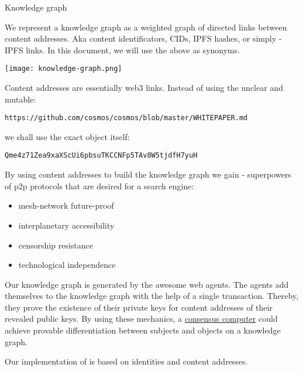 \documentclass[8pt,oneside]{amsart}
\makeatletter
\newcommand{\linkred}[2]{\href{#1}{\color{red}{#2}}}
\newcommand{\linkgreen}[2]{\href{#1}{\color{green}{#2}}}
\renewcommand\subsection{\@startsection{subsection}
                                    {2}{\z@}
                                    {-3.25ex\@plus -1ex \@minus -.2ex}
                                    {0ex \@plus .2ex}
                                    {\play\Large}
                        }
\newcommand{\titleSection}[1]{\subsection{#1}}
\newenvironment{Figure}
  {\par\medskip\noindent\minipage{\linewidth}}
  {\endminipage\par\medskip}
\makeatother
\begin{document}
\titleSection{Knowledge graph}\label{knowledge-graph}

We represent a knowledge graph as a weighted graph of directed links between content addresses. Aka content identificators, CIDs, IPFS hashes, or simply - IPFS links. In this document, we will use the above as synonyms.

\begin{Figure}
    \centering
    \texttt{[image: knowledge-graph.png]}
\end{Figure}

Content addresses are essentially web3 links. Instead of using the unclear and mutable:
\begin{lstlisting}
https://github.com/cosmos/cosmos/blob/master/WHITEPAPER.md
\end{lstlisting}
we shall use the exact object itself:
\begin{lstlisting}
Qme4z71Zea9xaXScUi6pbsuTKCCNFp5TAv8W5tjdfH7yuH
\end{lstlisting}

By using content addresses to build the knowledge graph we gain \linkred{https://steemit.com/web3/@hipster/an-idea-of-decentralized-search-for-web3-ce860d61defe5est}{the so much needed} \linkgreen{https://ipfs.io/ipfs/QmV9tSDx9UiPeWExXEeH6aoDvmihvx6jD5eLb4jbTaKGps}{IPFS} - \linkgreen{https://ipfs.io/ipfs/QmXHGmfo4sjdHVW2MAxczAfs44RCpSeva2an4QvkzqYgfR}{like} superpowers of p2p protocols that are desired for a search engine:

\begin{itemize}
\item mesh-network future-proof
\item interplanetary accessibility
\item censorship resistance
\item technological independence
\end{itemize}

Our knowledge graph is generated by the awesome web agents. The agents add themselves to the knowledge graph with the help of a single transaction. Thereby, they prove the existence of their private keys for content addresses of their revealed public keys. By using these mechanics, a {\hyperref[consensus-computer]{consensus computer}} could achieve provable differentiation between subjects and objects on a knowledge graph.

Our implementation of \linkred{https://github.com/cybercongress/cyberd}{cyberd} is based on \linkred{https://github.com/cosmos/cosmos-sdk}{cosmos-SDK} identities and \linkred{https://github.com/multiformats/cid#cidv0}{CIDv0/CIDv1} content addresses.
\end{document}
